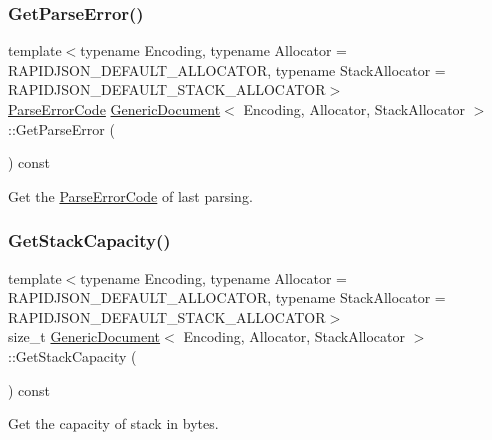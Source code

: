 \subsubsection{\texorpdfstring{Get\+Parse\+Error()}{GetParseError()}}
{\footnotesize\ttfamily template$<$typename Encoding, typename Allocator = R\+A\+P\+I\+D\+J\+S\+O\+N\+\_\+\+D\+E\+F\+A\+U\+L\+T\+\_\+\+A\+L\+L\+O\+C\+A\+T\+OR, typename Stack\+Allocator = R\+A\+P\+I\+D\+J\+S\+O\+N\+\_\+\+D\+E\+F\+A\+U\+L\+T\+\_\+\+S\+T\+A\+C\+K\+\_\+\+A\+L\+L\+O\+C\+A\+T\+OR$>$ \\
\hyperlink{group__RAPIDJSON__ERRORS_ga8d4b32dfc45840bca189ade2bbcb6ba7}{Parse\+Error\+Code} \hyperlink{classGenericDocument}{Generic\+Document}$<$ Encoding, Allocator, Stack\+Allocator $>$\+::Get\+Parse\+Error (\begin{DoxyParamCaption}{ }\end{DoxyParamCaption}) const\hspace{0.3cm}{\ttfamily [inline]}}



Get the \hyperlink{group__RAPIDJSON__ERRORS_ga8d4b32dfc45840bca189ade2bbcb6ba7}{Parse\+Error\+Code} of last parsing. 

\mbox{\label{classGenericDocument_a9e2e543c326b8b981d4f2c3d6793d15b}} 
\subsubsection{\texorpdfstring{Get\+Stack\+Capacity()}{GetStackCapacity()}}
{\footnotesize\ttfamily template$<$typename Encoding, typename Allocator = R\+A\+P\+I\+D\+J\+S\+O\+N\+\_\+\+D\+E\+F\+A\+U\+L\+T\+\_\+\+A\+L\+L\+O\+C\+A\+T\+OR, typename Stack\+Allocator = R\+A\+P\+I\+D\+J\+S\+O\+N\+\_\+\+D\+E\+F\+A\+U\+L\+T\+\_\+\+S\+T\+A\+C\+K\+\_\+\+A\+L\+L\+O\+C\+A\+T\+OR$>$ \\
size\+\_\+t \hyperlink{classGenericDocument}{Generic\+Document}$<$ Encoding, Allocator, Stack\+Allocator $>$\+::Get\+Stack\+Capacity (\begin{DoxyParamCaption}{ }\end{DoxyParamCaption}) const\hspace{0.3cm}{\ttfamily [inline]}}



Get the capacity of stack in bytes. 

